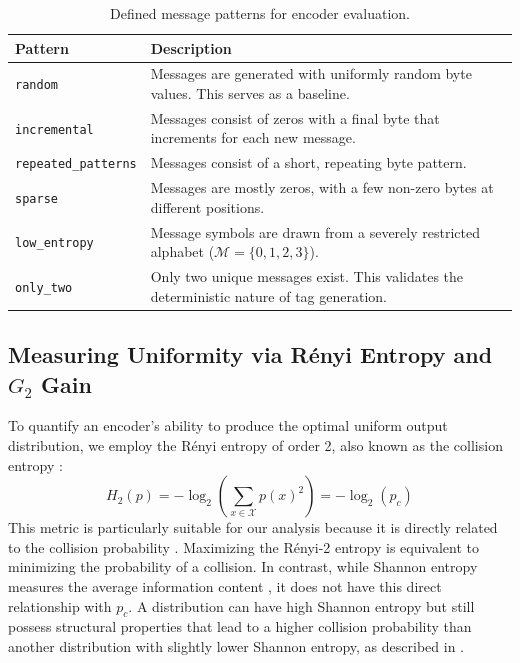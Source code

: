 \documentclass[english,BCOR=4mm,cdfont=false]{tudscrreprt} %
\begin{document}
\begin{table}[h!]
\centering
\caption{Defined message patterns for encoder evaluation.}
\label{tab:message_patterns}
\begin{tabularx}{\textwidth}{@{} lX @{}}
\toprule
\textbf{Pattern} & \textbf{Description} \\
\midrule
\texttt{random} & Messages are generated with uniformly random byte values. This serves as a baseline. \\
\texttt{incremental} & Messages consist of zeros with a final byte that increments for each new message. \\
\texttt{repeated\_patterns} & Messages consist of a short, repeating byte pattern. \\
\texttt{sparse} & Messages are mostly zeros, with a few non-zero bytes at different positions. \\
\texttt{low\_entropy} & Message symbols are drawn from a severely restricted alphabet ($\mathcal{M}=\{0,1,2,3\}$). \\
\texttt{only\_two} & Only two unique messages exist. This validates the deterministic nature of tag generation. \\
\bottomrule
\end{tabularx}
\end{table}

\subsection{Measuring Uniformity via Rényi Entropy and \texorpdfstring{$G_2$}{G2} Gain}
\label{sec:G_2}
To quantify an encoder's ability to produce the optimal uniform output distribution, we employ the Rényi entropy of order 2, also known as the collision entropy \cite{renyi1961measures}:
\begin{equation}
    H_2(p) = -\log_2 \left( \sum_{x \in \mathcal{X}} p(x)^2 \right) = -\log_2(p_c)
\end{equation}
This metric is particularly suitable for our analysis because it is directly related to the collision probability \cite{cachin1997entropy}. Maximizing the Rényi-2 entropy is equivalent to minimizing the probability of a collision. In contrast, while Shannon entropy measures the average information content \cite{The_mathematical_theory_of_communication}, it does not have this direct relationship with $p_c$. A distribution can have high Shannon entropy but still possess structural properties that lead to a higher collision probability than another distribution with slightly lower Shannon entropy, as described in \cite{renyiEntropy}.
\end{document}
